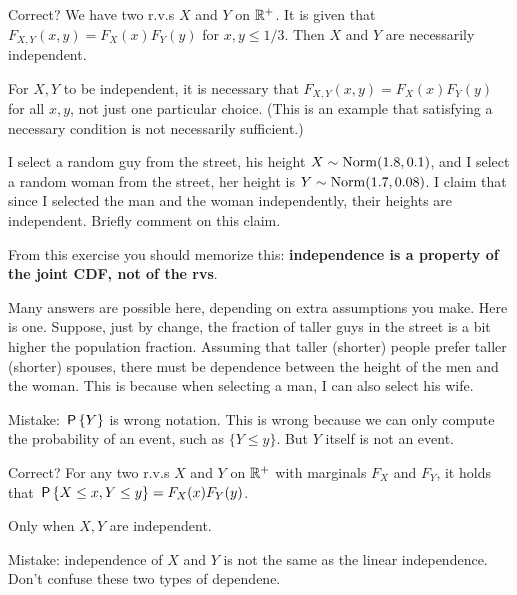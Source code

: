 \documentclass[../../assignments/assignments]{subfiles}
\begin{document}


\begin{exercise}
Correct? We have two r.v.s $X$ and $Y$ on $\R^{+}$. It is given that $F_{X,Y}(x,y) = F_X(x)F_Y(y)$ for $x,y \leq 1/3$. Then  $X$ and $Y$ are necessarily independent.
\begin{solution}
For $X, Y$ to be independent, it is necessary that  $F_{X,Y}(x,y) = F_X(x)F_Y(y)$ for all $x,y$, not just one particular choice. (This is an example that satisfying a necessary condition is not necessarily sufficient.)
\end{solution}
\end{exercise}

\begin{exercise}
I select a random guy from the street, his height $X\sim\Norm{1.8, 0.1}$, and I select a random woman from the street, her height is $Y\sim\Norm{1.7, 0.08}$.
I claim that since I selected the man and the woman independently, their heights are independent.
Briefly comment on this claim.
\begin{hint}
From this exercise you should memorize this: \textbf{independence is a property of the joint CDF, not of the rvs}.
\end{hint}
\begin{solution}
  Many answers are possible here, depending on extra assumptions you make.
  Here is one.
  Suppose, just by change, the fraction of taller guys in the street is a bit higher the population fraction.
  Assuming that taller (shorter) people prefer taller (shorter) spouses, there must be dependence between the height of the men and the woman. This is because when selecting a man, I can also select his wife.

Mistake:   $\P{Y}$ is wrong notation. This is wrong because we can only compute the probability of an event, such as $\{Y\leq y\}$. But $Y$ itself is not an event.
\end{solution}
\end{exercise}


\begin{exercise}
Correct? For any two r.v.s $X$ and $Y$ on $\R^{+}$ with marginals $F_{X}$ and $F_{Y}$, it holds that $\P{X\leq x, Y\leq y} = F_{X}(x) F_{Y}(y)$.
\begin{solution}
Only when $X, Y$ are independent.

Mistake:  independence of $X$ and $Y$ is not the same as the linear independence. Don't confuse these two types of dependene.
\end{solution}

\end{exercise}
\end{document}
